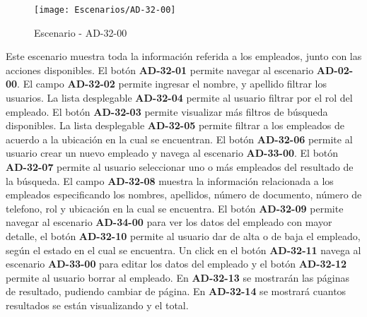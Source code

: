 \begin{figure}[H]
\centering
\texttt{[image: Escenarios/AD-32-00]}
\caption{Escenario - AD-32-00}
\label{fig:AD-32-00}
\end{figure}
Este escenario muestra toda la información referida a los empleados, junto con las acciones disponibles.
El botón \textbf{AD-32-01} permite navegar al escenario \textbf{AD-02-00}. El campo \textbf{AD-32-02} permite ingresar el nombre, y apellido filtrar los usuarios. La lista desplegable \textbf{AD-32-04} permite al usuario filtrar por el rol del empleado. El botón \textbf{AD-32-03} permite visualizar más filtros de búsqueda disponibles. La lista desplegable \textbf{AD-32-05} permite filtrar a los empleados de acuerdo a la ubicación en la cual se encuentran.
El botón \textbf{AD-32-06} permite al usuario crear un nuevo empleado y navega al escenario \textbf{AD-33-00}.
El botón \textbf{AD-32-07} permite al usuario seleccionar uno o más empleados del resultado de la búsqueda. El campo \textbf{AD-32-08} muestra la información relacionada a los empleados  especificando los nombres, apellidos, número de documento, número de telefono, rol y ubicación en la cual se encuentra. El botón \textbf{AD-32-09} permite navegar al escenario \textbf{AD-34-00} para ver los datos del empleado con mayor detalle, el botón \textbf{AD-32-10} permite al usuario dar de alta o de baja el empleado, según el estado en el cual se encuentra. Un click en el botón \textbf{AD-32-11} navega al escenario \textbf{AD-33-00} para editar los datos del empleado y el botón \textbf{AD-32-12} permite al usuario borrar al empleado.
En  \textbf{AD-32-13} se mostrarán las páginas de resultado, pudiendo cambiar de página. En \textbf{AD-32-14} se mostrará cuantos resultados se están visualizando y el total.
\clearpage

